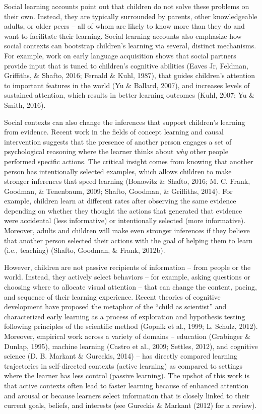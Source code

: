 \documentclass[oneside]{report}
\begin{document}
Social learning accounts point out that children do not solve these
problems on their own. Instead, they are typically surrounded by
parents, other knowledgeable adults, or older peers -- all of whom are
likely to know more than they do and want to facilitate their learning.
Social learning accounts also emphasize how social contexts can
bootstrap children's learning via several, distinct mechanisms. For
example, work on early language acquisition shows that social partners
provide input that is tuned to children's cognitive abilities (Eaves Jr,
Feldman, Griffiths, \& Shafto, 2016; Fernald \& Kuhl, 1987), that guides
children's attention to important features in the world (Yu \& Ballard,
2007), and increases levels of sustained attention, which results in
better learning outcomes (Kuhl, 2007; Yu \& Smith, 2016).

Social contexts can also change the inferences that support children's
learning from evidence. Recent work in the fields of concept learning
and causal intervention suggests that the presence of another person
engages a set of psychological reasoning where the learner thinks about
\emph{why} other people performed specific actions. The critical insight
comes from knowing that another person has intentionally selected
examples, which allows children to make stronger inferences that speed
learning (Bonawitz \& Shafto, 2016; M. C. Frank, Goodman, \& Tenenbaum,
2009; Shafto, Goodman, \& Griffiths, 2014). For example, children learn
at different rates after observing the same evidence depending on
whether they thought the actions that generated that evidence were
accidental (less informative) or intentionally selected (more
informative). Moreover, adults and children will make even stronger
inferences if they believe that another person selected their actions
with the goal of helping them to learn (i.e., teaching) (Shafto,
Goodman, \& Frank, 2012b).

However, children are not passive recipients of information -- from
people or the world. Instead, they actively select behaviors -- for
example, asking questions or choosing where to allocate visual attention
-- that can change the content, pacing, and sequence of their learning
experience. Recent theories of cognitive development have proposed the
metaphor of the ``child as scientist'' and characterized early learning
as a process of exploration and hypothesis testing following principles
of the scientific method (Gopnik et al., 1999; L. Schulz, 2012).
Moreover, empirical work across a variety of domains -- education
(Grabinger \& Dunlap, 1995), machine learning (Castro et al., 2009;
Settles, 2012), and cognitive science (D. B. Markant \& Gureckis, 2014)
-- has directly compared learning trajectories in self-directed contexts
(active learning) as compared to settings where the learner has less
control (passive learning). The upshot of this work is that active
contexts often lead to faster learning because of enhanced attention and
arousal or because learners select information that is closely linked to
their current goals, beliefs, and interests (see Gureckis \& Markant
(2012) for a review).
\end{document}
